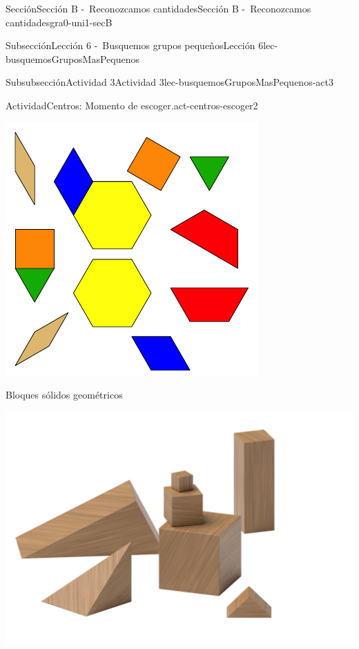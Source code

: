 \documentclass[twoside,10pt,]{article}
\begin{document}
\begin{sectionptx}{Sección}{Sección B -~Reconozcamos cantidades}{}{Sección B -~Reconozcamos cantidades}{}{}{gra0-uni1-secB}
\begin{subsectionptx}{Subsección}{Lección 6 -~Busquemos grupos pequeños}{}{Lección 6}{}{}{lec-busquemosGruposMasPequenos}
\begin{subsubsectionptx}{Subsubsección}{Actividad 3}{}{Actividad 3}{}{}{lec-busquemosGruposMasPequenos-act3}
\begin{activity}{Actividad}{Centros: Momento de escoger.}{act-centros-escoger2}
\begin{sidebyside}{2}{0.025}{0.025}{0.05}
\begin{sbspanel}{0.45}
\includegraphics[width=\linewidth]{external/svg-source/tikz-file-147344.pdf}
\end{sbspanel}%
\end{sidebyside}%
\begin{sidebyside}{2}{0.025}{0.025}{0.05}%
\begin{sbspanel}{0.45}%
Bloques sólidos geométricos%
\par
\includegraphics[width=\linewidth]{external/png-source/K.1.A Beta Student Workbook.Geoblocks.png}
\end{sbspanel}%

\end{sidebyside}
\end{activity}
\end{subsubsectionptx}
\end{subsectionptx}
\end{sectionptx}
\end{document}
